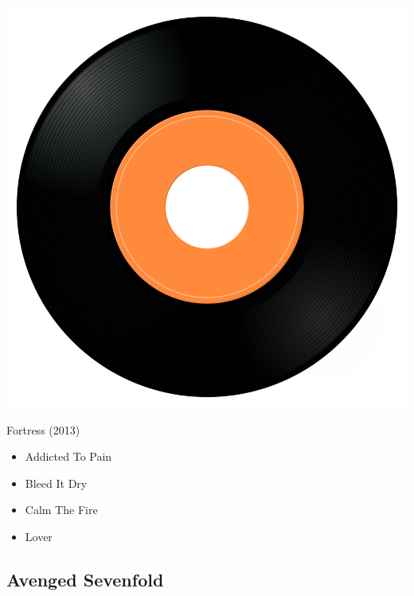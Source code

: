 \begin{minipage}[t]{0.25\textwidth}
\captionsetup{type=figure}
\includegraphics[width=\textwidth]{Images/cover.png}
\caption*{Fortress (2013)}
\end{minipage}
\begin{minipage}[t]{0.25\textwidth}\vspace{0pt}
\begin{itemize}[nosep,leftmargin=1em,labelwidth=*,align=left]
	\setlength{\itemsep}{0pt}
	\item Addicted To Pain
	\item Bleed It Dry
	\item Calm The Fire
	\item Lover
\end{itemize}
\end{minipage}

\subsection{Avenged Sevenfold}

